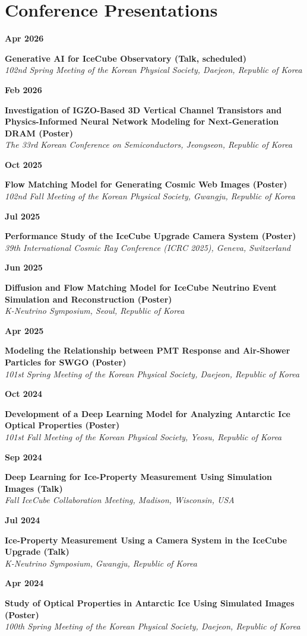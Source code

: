 \documentclass[11pt, a4paper]{article}
\newcommand{\conferenceitem}[3]{%
    \noindent
    \parbox[t]{0.15\textwidth}{{\color{primary}\textbf{#1}}}%
    \hfill
    \parbox[t]{0.83\textwidth}{\textbf{#2}\\[2pt]\textit{#3}}%
    \vspace{8pt}\par
}
\begin{document}
\section{Conference Presentations}
\conferenceitem{Apr 2026}{Generative AI for IceCube Observatory (Talk, scheduled)}{102nd Spring Meeting of the Korean Physical Society, Daejeon, Republic of Korea}

\conferenceitem{Feb 2026}{Investigation of IGZO-Based 3D Vertical Channel Transistors and Physics-Informed Neural Network Modeling for Next-Generation DRAM (Poster)}{The 33rd Korean Conference on Semiconductors, Jeongseon, Republic of Korea}

\conferenceitem{Oct 2025}{Flow Matching Model for Generating Cosmic Web Images (Poster)}{102nd Fall Meeting of the Korean Physical Society, Gwangju, Republic of Korea}

\conferenceitem{Jul 2025}{Performance Study of the IceCube Upgrade Camera System (Poster)}{39th International Cosmic Ray Conference (ICRC 2025), Geneva, Switzerland}

\conferenceitem{Jun 2025}{Diffusion and Flow Matching Model for IceCube Neutrino Event Simulation and Reconstruction (Poster)}{K-Neutrino Symposium, Seoul, Republic of Korea}

\conferenceitem{Apr 2025}{Modeling the Relationship between PMT Response and Air-Shower Particles for SWGO (Poster)}{101st Spring Meeting of the Korean Physical Society, Daejeon, Republic of Korea}

\conferenceitem{Oct 2024}{Development of a Deep Learning Model for Analyzing Antarctic Ice Optical Properties (Poster)}{101st Fall Meeting of the Korean Physical Society, Yeosu, Republic of Korea}

\conferenceitem{Sep 2024}{Deep Learning for Ice-Property Measurement Using Simulation Images (Talk)}{Fall IceCube Collaboration Meeting, Madison, Wisconsin, USA}

\conferenceitem{Jul 2024}{Ice-Property Measurement Using a Camera System in the IceCube Upgrade (Talk)}{K-Neutrino Symposium, Gwangju, Republic of Korea}

\conferenceitem{Apr 2024}{Study of Optical Properties in Antarctic Ice Using Simulated Images (Poster)}{100th Spring Meeting of the Korean Physical Society, Daejeon, Republic of Korea}
\end{document}
